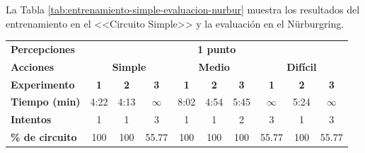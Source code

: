 La Tabla \ref{tab:entrenamiento-simple-evaluacion-nurbur} muestra los resultados del entrenamiento en el <<Circuito Simple>> y la evaluación en el Nürburgring.

\newpage


\begin{table}[ht!]
\centering
\begin{tabular}{|l|c|c|c|c|c|c|c|c|c|}
\hline
\rowcolor[HTML]{EFEFEF} 
\multicolumn{10}{|c|}{\cellcolor[HTML]{EFEFEF}\textbf{Entrenamiento en Circuito Simple y ejecución en Nürburgring}}                                                                                                                                                               \\ \hline
\rowcolor[HTML]{EFEFEF} 
\textbf{Percepciones}                           & \multicolumn{9}{c|}{\cellcolor[HTML]{EFEFEF}\textbf{1 punto}}                                                                                                                                                            \\ \hline
\rowcolor[HTML]{EFEFEF} 
\textbf{Acciones}                               & \multicolumn{3}{c|}{\cellcolor[HTML]{EFEFEF}\textbf{Simple}} & \multicolumn{3}{c|}{\cellcolor[HTML]{EFEFEF}\textbf{Medio}} & \multicolumn{3}{c|}{\cellcolor[HTML]{EFEFEF}\textbf{Difícil}}                               \\ \hline
\rowcolor[HTML]{EFEFEF} 
\textbf{Experimento}                            & \textbf{1}   & \textbf{2}   & \textbf{3}                     & \textbf{1}   & \textbf{2}   & \textbf{3}                    & \textbf{1}                    & \textbf{2}                  & \textbf{3}                    \\ \hline
\rowcolor[HTML]{FFFFFF} 
\cellcolor[HTML]{EFEFEF}\textbf{Tiempo (min)}   & 4:22         & \cellcolor[HTML]{32CB00}4:13         & $\infty$                       & 8:02         & 4:54         & 5:45                          & $\infty$                      & 5:24                        & $\infty$                      \\ \hline
\rowcolor[HTML]{FFFFFF} 
\cellcolor[HTML]{EFEFEF}\textbf{Intentos}       & 1            & 1            & 3                              & 1            & 1            & 2                             & 3                             & 1                           & 3                             \\ \hline
\rowcolor[HTML]{32CB00} 
\cellcolor[HTML]{EFEFEF}\textbf{\% de circuito} & 100          & 100          & \cellcolor[HTML]{FFC702}55.77  & 100          & 100          & 100                           & \cellcolor[HTML]{FFC702}55.77 & 100                         & \cellcolor[HTML]{FFC702}55.77 \\ \hline

\end{tabular}
\end{table}
